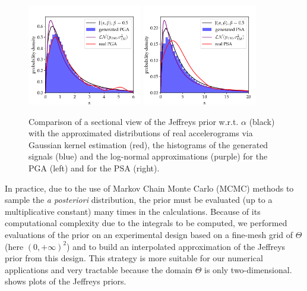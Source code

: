        \begin{figure}[!ht]
        \centering
        {\includegraphics[width=5cm]{figures/uncIM/PGA_density.pdf}}
        {\includegraphics[width=5cm]{figures/uncIM/PSA_density.pdf}}        
        \caption{Comparison of a sectional view of the Jeffreys prior w.r.t. $\alpha$ (black) with the approximated distributions of real accelerograms via Gaussian kernel estimation (red), the histograms of the generated signals (blue) and the log-normal approximations (purple) for the PGA (left) and for the PSA (right).}
         \label{uncIM:fig:IM}
    \end{figure}

        In practice, due to the use of Markov Chain Monte Carlo (MCMC) methods to sample the \emph{a posteriori} distribution, the prior must be evaluated (up to a multiplicative constant) many times in the calculations. Because of its computational complexity due to the integrals to be computed, we performed evaluations of the prior on an experimental design based on a fine-mesh grid of $\Theta$ (here $(0,+\infty)^2$) and to build an interpolated approximation of the Jeffreys prior from this design. This strategy is more suitable for our numerical applications and very tractable because the domain $\Theta$ is only two-dimensional.  shows plots of the Jeffreys priors. 
        
